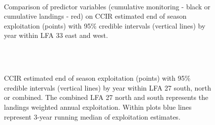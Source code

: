 \documentclass[11pt]{article}
\newcommand{\D}{.}
\newcommand{\e}{/backup/bio_data/bio.lobster/figures/} %
\begin{document}
\begin{figure}
        \centering
         \\
               \caption{Comparison of predictor variables (cumulative monitoring - black or cumulative landings - red) on CCIR estimated end of season exploitation (points) with 95\% credible intervals (vertical lines) by year within LFA 33 east and west.}
        \end{figure}



\begin{figure}
        \centering
         \\
                \\
                 \caption{CCIR estimated end of season exploitation (points) with 95\% credible intervals (vertical lines) by year within LFA 27 south, north or combined. The combined LFA 27 north and south represents the landings weighted annual exploitation. Within plots blue lines represent 3-year running median of exploitation estimates.}
        \end{figure}
\end{document}
